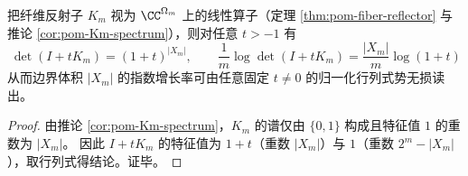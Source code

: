 \begin{corollary}[纤维反射子的行列式势：\texorpdfstring{$\det(I+tK_m)=(1+t)^{|X_m|}$}{det(I+tK)=(1+t)^|X|}]\label{cor:op-algebra-fiber-reflector-determinant-potential}
把纤维反射子 \(K_m\) 视为 \(\CC^{\Omega_m}\) 上的线性算子（定理 \ref{thm:pom-fiber-reflector} 与推论 \ref{cor:pom-Km-spectrum}），则对任意 \(t>-1\) 有
\[
\boxed{\;
\det(I+tK_m)=(1+t)^{|X_m|},\qquad
\frac{1}{m}\log\det(I+tK_m)=\frac{|X_m|}{m}\log(1+t)\;}
\]
从而边界体积 \(|X_m|\) 的指数增长率可由任意固定 \(t\neq 0\) 的归一化行列式势无损读出。
\end{corollary}
\begin{proof}
由推论 \ref{cor:pom-Km-spectrum}，\(K_m\) 的谱仅由 \(\{0,1\}\) 构成且特征值 \(1\) 的重数为 \(|X_m|\)。
因此 \(I+tK_m\) 的特征值为 \(1+t\)（重数 \(|X_m|\)）与 \(1\)（重数 \(2^m-|X_m|\)），取行列式得结论。证毕。
\end{proof}


